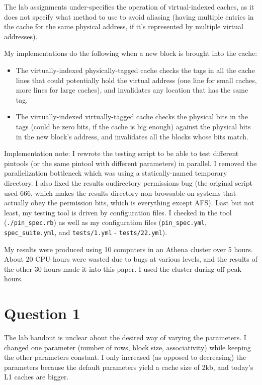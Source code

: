 The lab assignments under-specifies the operation of virtual-indexed caches, as
it does not specify what method to use to avoid aliasing (having multiple
entries in the cache for the same physical address, if it's represented by
multiple virtual addresses).

My implementations do the following when a new block is brought into the cache:
\begin{itemize}
  \item The virtually-indexed physically-tagged cache checks the tags in all
  the cache lines that could potentially hold the virtual address (one line for
  small caches, more lines for large caches), and invalidates any location that
  has the same tag.
  \item The virtually-indexed virtually-tagged cache checks the physical bits
  in the tags (could be zero bits, if the cache is big enough) against the
  physical bits in the new block's address, and invalidates all the blocks
  whose bits match.
\end{itemize}

Implementation note: I rewrote the testing script to be able to test different
pintools (or the same pintool with different parameters) in parallel. I removed
the parallelization bottleneck which was using a statically-named temporary
directory. I also fixed the results oudirectory permissions bug (the original
script used 666, which makes the results directory non-browsable on systems
that actually obey the permission bits, which is everything except AFS). Last
but not least, my testing tool is driven by configuration files. I checked in
the tool (\texttt{./pin\_spec.rb}) as well as my configuration files
(\texttt{pin\_spec.yml}, \texttt{spec\_suite.yml}, and \texttt{tests/1.yml} -
\texttt{tests/22.yml}).

My results were produced using 10 computers in an Athena cluster over 5 hours.
About 20 CPU-hours were wasted due to bugs at various levels, and the results
of the other 30 hours made it into this paper. I used the cluster during
off-peak hours.

\section{Question 1}
The lab handout is unclear about the desired way of varying the parameters. I
changed one parameter (number of rows, block size, associativity) while keeping
the other parameters constant. I only increased (as opposed to decreasing) the
parameters because the default parameters yield a cache size of 2kb, and today's
L1 caches are bigger.

